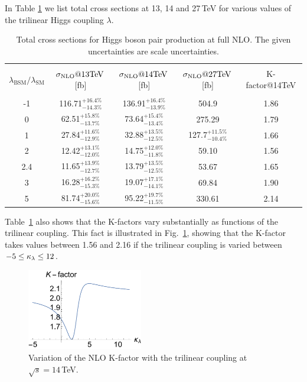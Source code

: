 In Table \ref{tab:sigmatot} we list total cross sections at 13, 14 and 27\,TeV for various values of the trilinear Higgs coupling $\lambda$. 
\begin{table}[htb]
\begin{center}
\begin{tabular}{| c | c | c |c|c|}
\hline
&&&&\\
$\lambda_{\mathrm{BSM}}/\lambda_{\mathrm{SM}}$ & $\sigma_{\rm{NLO}}@13 \mathrm{TeV}$\,[fb]& $\sigma_{\rm{NLO}}@14 \mathrm{TeV}$\,[fb] & $\sigma_{\rm{NLO}}@27 \mathrm{TeV}$\,[fb] &K-factor@14TeV\\
&&&&\\
\hline
-1& 116.71$^{+16.4\%}_{-14.3\%}$  & 136.91$^{+16.4\%}_{-13.9\%}$& 504.9 & 1.86 \\
\hline
0& 62.51$^{+15.8\%}_{-13.7\%}$ & 73.64$^{+15.4\%}_{-13.4\%}$& 275.29& 1.79  \\
\hline 
1& 27.84$^{+11.6\%}_{-12.9\%}$ & 32.88$^{+13.5\%}_{-12.5\%}$&127.7$^{+11.5\%}_{-10.4\%}$ &1.66\\
\hline
2 & 12.42$^{+13.1\%}_{-12.0\%}$ & 14.75$^{+12.0\%}_{-11.8\%}$ &  59.10 & 1.56 \\
\hline
2.4& 11.65$^{+13.9\%}_{-12.7\%}$ & 13.79$^{+13.5\%}_{-12.5\%}$& 53.67 & 1.65 \\
\hline
3& 16.28$^{+16.2\%}_{-15.3\%}$ & 19.07$^{+17.1\%}_{-14.1\%}$ & 69.84 & 1.90 \\
\hline 
5& 81.74$^{+20.0\%}_{-15.6\%}$  & 95.22$^{+19.7\%}_{-11.5\%}$& 330.61 & 2.14 \\
\hline 
\end{tabular}
\end{center}
\caption{Total cross sections for Higgs boson pair production at full NLO. The given uncertainties are scale uncertainties. 
\label{tab:sigmatot}}
\end{table}
Table~\ref{tab:sigmatot} also shows that the K-factors vary substantially as functions of the trilinear coupling.
This fact is illustrated in Fig.~\ref{fig:Kfacvariation}, showing that the K-factor takes values between 1.56 and 2.16
if the trilinear coupling is varied between $-5\leq \kappa_{\lambda}\leq 12$.

\begin{figure}[htb]
  \centering
    \includegraphics[width=0.45\textwidth]{plots/Kfac_varlambda.pdf}
\caption{Variation of the NLO K-factor with the trilinear coupling at $\sqrt{s}=14$\,TeV.}
\label{fig:Kfacvariation}
\end{figure}



